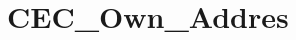 \hypertarget{group___c_e_c___own___addres}{\section{C\-E\-C\-\_\-\-Own\-\_\-\-Addres}
\label{group___c_e_c___own___addres}
}
